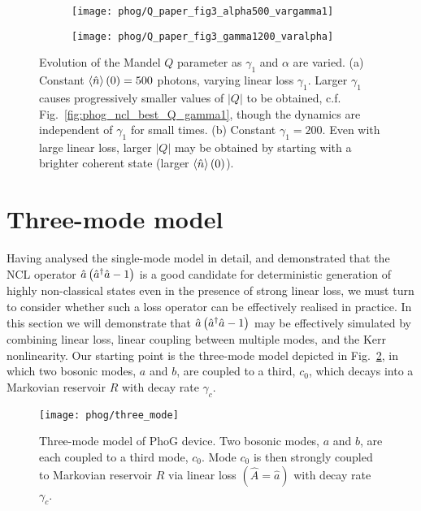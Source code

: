 \begin{figure}[htp]
\centering
	\begin{subfigure}{0.6\linewidth}
	\centering
	\caption{}
	\texttt{[image: phog/Q\_paper\_fig3\_alpha500\_vargamma1]}
	\end{subfigure}
	\begin{subfigure}{0.6\linewidth}
	\centering
	\caption{}
	\texttt{[image: phog/Q\_paper\_fig3\_gamma1200\_varalpha]}
	\end{subfigure}
\caption{\label{fig:phog_fig3paper2} Evolution of the Mandel $Q$ parameter as $\gamma_1$ and $\alpha$ are varied. (a) Constant $\ev{\hat{n}}\left(0\right) = 500$ photons, varying linear loss $\gamma_1$. Larger $\gamma_1$ causes progressively smaller values of $\left|Q\right|$ to be obtained, c.f. Fig.~\ref{fig:phog_ncl_best_Q_gamma1}, though the dynamics are independent of $\gamma_1$ for small times. (b) Constant $\gamma_1 = 200$. Even with large linear loss, larger $\left|Q\right|$ may be obtained by starting with a brighter coherent state (larger $\ev{\hat{n}}\left(0\right)$).}
\end{figure}



\clearpage
\section{Three-mode model}
Having analysed the single-mode model in detail, and demonstrated that the NCL operator $\hat{a}\left(\hat{a}^\dagger \hat{a} - 1\right)$ is a good candidate for deterministic generation of highly non-classical states even in the presence of strong linear loss, we must turn to consider whether such a loss operator can be effectively realised in practice. In this section we will demonstrate that $\hat{a}\left(\hat{a}^\dagger \hat{a} - 1\right)$ may be effectively simulated by combining linear loss, linear coupling between multiple modes, and the Kerr nonlinearity. Our starting point is the three-mode model depicted in Fig.~\ref{fig:phog_three_mode}, in which two bosonic modes, $a$ and $b$, are coupled to a third, $c_0$, which decays into a Markovian reservoir $R$ with decay rate $\gamma_c$. 

\begin{figure}[htp]
\centering
\texttt{[image: phog/three\_mode]}
\caption{\label{fig:phog_three_mode} Three-mode model of PhoG device. Two bosonic modes, $a$ and $b$, are each coupled to a third mode, $c_0$. Mode $c_0$ is then strongly coupled to Markovian reservoir $R$ via linear loss $\left(\hat{A} = \hat{a}\right)$ with decay rate $\gamma_c$. }
\end{figure}

